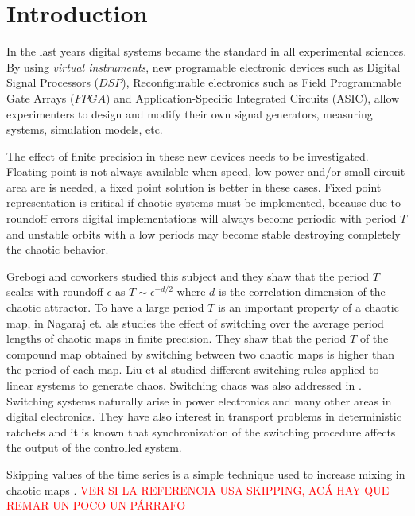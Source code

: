 \section{Introduction} \label{sec:intro}

In the last years digital systems became the standard in all experimental sciences.
By using \textit{virtual instruments}, new programable electronic devices such as Digital Signal Processors ($DSP$), Reconfigurable electronics such as Field Programmable Gate Arrays ($FPGA$) and Application-Specific Integrated Circuits (ASIC), allow experimenters to design and modify their own signal generators, measuring systems, simulation models, etc.

The effect of finite precision in these new devices needs to be investigated.
Floating point is not always available when speed, low power and/or small circuit area are is needed, a fixed point solution is better in these cases.
Fixed point representation is critical if chaotic systems must be implemented, because due to roundoff errors digital implementations will always become periodic with period $T$ and unstable orbits with a low periods may become stable destroying completely the chaotic behavior.

Grebogi and coworkers \cite{Grebogi1988} studied this subject and they shaw that the period $T$ scales with roundoff $\epsilon$ as $T\sim\epsilon^{-d/2}$ where $d$ is the correlation dimension of the chaotic attractor.
To have a large period $T$ is an important property of a chaotic map, in \cite{Nagaraj2008} Nagaraj et. als studies the effect of switching over the average period lengths of chaotic maps in finite precision.
They shaw that the period $T$ of the compound map obtained by switching between two chaotic maps is higher than the period of each map.
Liu et al \cite{Liu2006} studied different switching rules applied to linear systems to generate chaos.
Switching chaos was also addressed in \cite{Gluskin2008}.
Switching systems naturally arise in power electronics and many other areas in digital electronics.
They have also interest in transport problems in deterministic ratchets \cite{Zarlenga2009} and it is known that synchronization of the switching procedure affects the output of the controlled system.

Skipping values of the time series is a simple technique used to increase mixing in chaotic maps \cite{DeMicco2008}.
\textcolor{red}{VER SI LA REFERENCIA USA SKIPPING, ACÁ HAY QUE REMAR UN POCO UN PÁRRAFO}

